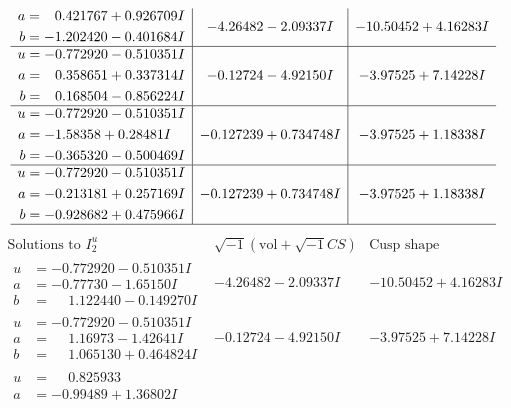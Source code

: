 \documentclass[1p]{elsarticle_modified}
\theoremstyle{definition}
\newcommand{\I}{\sqrt{-1}}
\begin{document}
$$\begin{array}{c|c|c}
\begin{aligned}
a &= \phantom{-}0.421767 + 0.926709 I \\
b &= -1.202420 - 0.401684 I\end{aligned}
 & -4.26482 - 2.09337 I & -10.50452 + 4.16283 I \\ \hline\begin{aligned}
u &= -0.772920 - 0.510351 I \\
a &= \phantom{-}0.358651 + 0.337314 I \\
b &= \phantom{-}0.168504 - 0.856224 I\end{aligned}
 & -0.12724 - 4.92150 I & -3.97525 + 7.14228 I \\ \hline\begin{aligned}
u &= -0.772920 - 0.510351 I \\
a &= -1.58358 + 0.28481 I \\
b &= -0.365320 - 0.500469 I\end{aligned}
 & -0.127239 + 0.734748 I & -3.97525 + 1.18338 I \\ \hline\begin{aligned}
u &= -0.772920 - 0.510351 I \\
a &= -0.213181 + 0.257169 I \\
b &= -0.928682 + 0.475966 I\end{aligned}
 & -0.127239 + 0.734748 I & -3.97525 + 1.18338 I\\
 \hline 
 \end{array}$$\newpage$$\begin{array}{c|c|c}  
\text{Solutions to }I^u_{2}& \I (\text{vol} + \sqrt{-1}CS) & \text{Cusp shape}\\
 \hline 
\begin{aligned}
u &= -0.772920 - 0.510351 I \\
a &= -0.77730 - 1.65150 I \\
b &= \phantom{-}1.122440 - 0.149270 I\end{aligned}
 & -4.26482 - 2.09337 I & -10.50452 + 4.16283 I \\ \hline\begin{aligned}
u &= -0.772920 - 0.510351 I \\
a &= \phantom{-}1.16973 - 1.42641 I \\
b &= \phantom{-}1.065130 + 0.464824 I\end{aligned}
 & -0.12724 - 4.92150 I & -3.97525 + 7.14228 I \\ \hline\begin{aligned}
u &= \phantom{-}0.825933\phantom{ +0.000000I} \\
a &= -0.99489 + 1.36802 I \\

\end{aligned}
\end{array}$$
\end{document}
